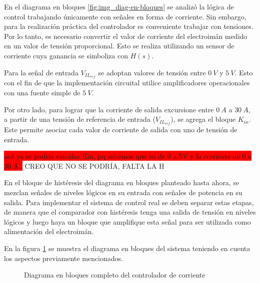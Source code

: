 En el diagrama en bloques \ref{fig:img_diag-en-bloques} se analizó la lógica de control trabajando únicamente con señales en forma de corriente. Sin embargo, para la realización práctica del controlador es conveniente trabajar con tensiones. Por lo tanto, es necesario  convertir el valor de corriente del electroimán medido en un valor de tensión proporcional. Esto se realiza utilizando un sensor de corriente cuya ganancia se simboliza con $H(s)$.

Para la señal de entrada $V_{IL_{ref}}$ se adoptan valores de tensión entre $0\:V$ y $5\:V$. Esto con el fin de que la implementación circuital utilice amplificadores operacionales con una fuente simple de $5\:V$. 

Por otro lado, para lograr que la corriente de salida excursione entre $0\:A$ a $30\:A$, a partir de una tensión de referencia de entrada ($V_{IL_{ref}}$), se agrega el bloque $K_{in}$. Este permite asociar cada valor de corriente de salida con uno de tensión de entrada.

\colorbox{red}{acá ya se podría calcular Kin, pq sabemos que va de 0 a 5V y la corriente de 0 a 30 A..} CREO QUE NO SE PODRÍA, FALTA LA H

En el bloque de histéresis del diagrama en bloques planteado hasta ahora, se mezclan señales de niveles lógicos en su entrada con señales de potencia en su salida. Para implementar el sistema de control real se deben separar estas etapas, de manera que el comparador con histéresis tenga una salida de tensión en niveles lógicos y luego haya un bloque que amplifique esta señal para ser utilizada como alimentación del electroimán.

En la figura \ref{fig:img_diag-en-bloques-conH-y-Kin} se muestra el diagrama en bloques del sistema teniendo en cuenta los aspectos previamente mencionados.


\begin{figure}[H]
	\centering
	
	\caption{Diagrama en bloques completo del controlador de corriente}	\label{fig:img_diag-en-bloques-conH-y-Kin}
\end{figure}


